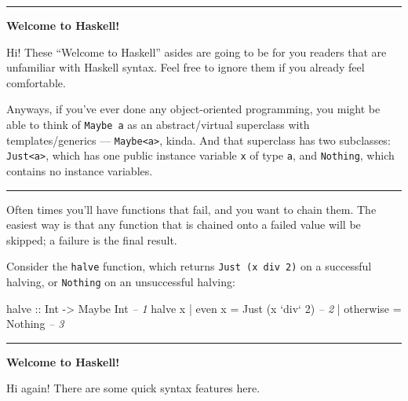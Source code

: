 \documentclass[]{article}
\newenvironment{Shaded}{}{}
\newcommand{\CommentTok}[1]{\textcolor[rgb]{0.38,0.63,0.69}{\textit{#1}}}
\newcommand{\DataTypeTok}[1]{\textcolor[rgb]{0.56,0.13,0.00}{#1}}
\newcommand{\DecValTok}[1]{\textcolor[rgb]{0.25,0.63,0.44}{#1}}
\newcommand{\FunctionTok}[1]{\textcolor[rgb]{0.02,0.16,0.49}{#1}}
\newcommand{\NormalTok}[1]{#1}
\newcommand{\OtherTok}[1]{\textcolor[rgb]{0.00,0.44,0.13}{#1}}
\begin{document}
\begin{center}\rule{0.5\linewidth}{\linethickness}\end{center}

\textbf{Welcome to Haskell!}

Hi! These ``Welcome to Haskell'' asides are going to be for you readers that are
unfamiliar with Haskell syntax. Feel free to ignore them if you already feel
comfortable.

Anyways, if you've ever done any object-oriented programming, you might be able
to think of \texttt{Maybe\ a} as an abstract/virtual superclass with
templates/generics --- \texttt{Maybe\textless{}a\textgreater{}}, kinda. And that
superclass has two subclasses: \texttt{Just\textless{}a\textgreater{}}, which
has one public instance variable \texttt{x} of type \texttt{a}, and
\texttt{Nothing}, which contains no instance variables.

\begin{center}\rule{0.5\linewidth}{\linethickness}\end{center}

Often times you'll have functions that fail, and you want to chain them. The
easiest way is that any function that is chained onto a failed value will be
skipped; a failure is the final result.

Consider the \texttt{halve} function, which returns
\texttt{Just\ (x\ \textasciigrave{}div\textasciigrave{}\ 2)} on a successful
halving, or \texttt{Nothing} on an unsuccessful halving:

\begin{Shaded}
\begin{Highlighting}[]
\OtherTok{halve ::} \DataTypeTok{Int} \OtherTok{->} \DataTypeTok{Maybe} \DataTypeTok{Int}                       \CommentTok{-- 1}
\NormalTok{halve x }\FunctionTok{|}\NormalTok{ even x    }\FunctionTok{=} \DataTypeTok{Just}\NormalTok{ (x }\OtherTok{`div`} \DecValTok{2}\NormalTok{)          }\CommentTok{-- 2}
        \FunctionTok{|}\NormalTok{ otherwise }\FunctionTok{=} \DataTypeTok{Nothing}                   \CommentTok{-- 3}
\end{Highlighting}
\end{Shaded}

\begin{center}\rule{0.5\linewidth}{\linethickness}\end{center}

\textbf{Welcome to Haskell!}

Hi again! There are some quick syntax features here.
\end{document}
